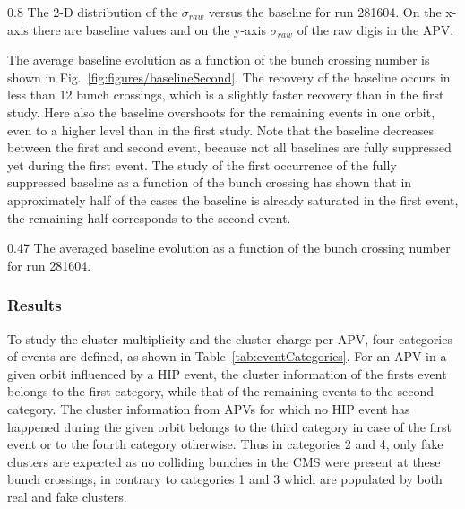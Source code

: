                  {0.8}       %
                 {The 2-D distribution of the $\sigma_{raw}$ versus the baseline for run 281604. On the x-axis there are baseline values and on the y-axis $\sigma_{raw}$ of the raw digis in the APV. } %


The average baseline evolution as a function of the bunch crossing number is shown in Fig.~\ref{fig:figures/baselineSecond}. The recovery of the baseline occurs in less than 12 bunch crossings, which is a slightly faster recovery than in the first study. Here also the baseline overshoots for the remaining events in one orbit, even to a higher level than in the first study. Note that the baseline decreases between the first and second event, because not all baselines are fully suppressed yet during the first event. The study of the first occurrence of the fully suppressed baseline as a function of the bunch crossing has shown that in approximately half of the cases the baseline is already saturated in the first event, the remaining half corresponds to the second event.

                 {0.47}       %
                 {The averaged baseline evolution as a function of the bunch crossing number for run 281604. } %
 

\subsubsection{Results}

To study the cluster multiplicity and the cluster charge per APV, four categories of events are defined, as shown in Table~\ref{tab:eventCategories}. For an APV in a given orbit influenced by a HIP event, the cluster information of the firsts event belongs to the first category, while that of the remaining events to the second category. The cluster information from APVs for which no HIP event has happened during the given orbit belongs to the third category in case of the first event or to the fourth category otherwise. Thus in categories 2 and 4, only fake clusters are expected as no colliding bunches in the CMS were present at these bunch crossings, in contrary to categories 1 and 3 which are populated by both real and fake clusters.


